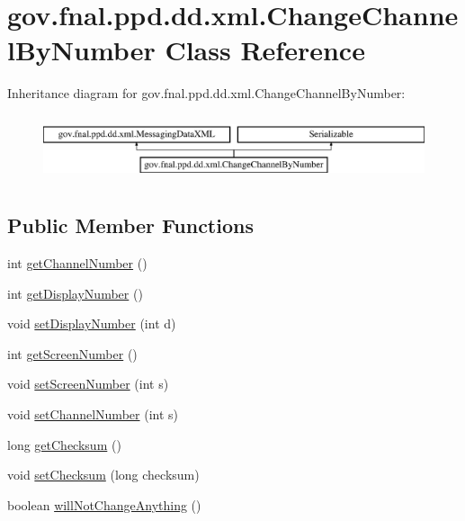 \hypertarget{classgov_1_1fnal_1_1ppd_1_1dd_1_1xml_1_1ChangeChannelByNumber}{\section{gov.\-fnal.\-ppd.\-dd.\-xml.\-Change\-Channel\-By\-Number Class Reference}
\label{classgov_1_1fnal_1_1ppd_1_1dd_1_1xml_1_1ChangeChannelByNumber}
}
Inheritance diagram for gov.\-fnal.\-ppd.\-dd.\-xml.\-Change\-Channel\-By\-Number\-:\begin{figure}[H]
\begin{center}
\leavevmode
\includegraphics[height=1.964912cm]{classgov_1_1fnal_1_1ppd_1_1dd_1_1xml_1_1ChangeChannelByNumber}
\end{center}
\end{figure}
\subsection*{Public Member Functions}
\begin{DoxyCompactItemize}
\item 
int \hyperlink{classgov_1_1fnal_1_1ppd_1_1dd_1_1xml_1_1ChangeChannelByNumber_ac8f7e778114ee7d1183ed2bc68a0f65d}{get\-Channel\-Number} ()
\item 
int \hyperlink{classgov_1_1fnal_1_1ppd_1_1dd_1_1xml_1_1ChangeChannelByNumber_a5e1dec54421c824b195d95cb8b3e6707}{get\-Display\-Number} ()
\item 
void \hyperlink{classgov_1_1fnal_1_1ppd_1_1dd_1_1xml_1_1ChangeChannelByNumber_a11187a24e489db625efe844e3ae6f5ce}{set\-Display\-Number} (int d)
\item 
int \hyperlink{classgov_1_1fnal_1_1ppd_1_1dd_1_1xml_1_1ChangeChannelByNumber_af9fc03a18d4dbb0e0a713b33394eaca5}{get\-Screen\-Number} ()
\item 
void \hyperlink{classgov_1_1fnal_1_1ppd_1_1dd_1_1xml_1_1ChangeChannelByNumber_a7177dc1dde2024cde8c0698196fd3d0e}{set\-Screen\-Number} (int s)
\item 
void \hyperlink{classgov_1_1fnal_1_1ppd_1_1dd_1_1xml_1_1ChangeChannelByNumber_a7a6781ab30940e3bd0114b48d0a607f6}{set\-Channel\-Number} (int s)
\item 
long \hyperlink{classgov_1_1fnal_1_1ppd_1_1dd_1_1xml_1_1ChangeChannelByNumber_abd0eaa8df26a127f7f821fcfa77d8df5}{get\-Checksum} ()
\item 
void \hyperlink{classgov_1_1fnal_1_1ppd_1_1dd_1_1xml_1_1ChangeChannelByNumber_a6673f8010f8ae42b850b018e81304a7c}{set\-Checksum} (long checksum)
\item 
boolean \hyperlink{classgov_1_1fnal_1_1ppd_1_1dd_1_1xml_1_1ChangeChannelByNumber_aed8bd0eb082367b599cf616cb7dca646}{will\-Not\-Change\-Anything} ()
\end{DoxyCompactItemize}
